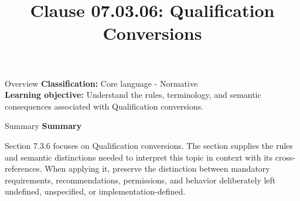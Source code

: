 \documentclass[10pt,letterpaper]{article}
\title{Clause 07.03.06: Qualification Conversions}
\author{}
\date{}
\begin{document}
\maketitle
\begin{CornellOverviewBox}{Overview}
\textbf{Classification:} Core language - Normative\\[2pt]
\textbf{Learning objective:} Understand the rules, terminology, and semantic consequences associated with Qualification conversions.
\end{CornellOverviewBox}\begin{CornellSummaryBox}{Summary}
{\sffamily\bfseries\color{Accent} Summary}\par\vspace{3pt}Section 7.3.6 focuses on Qualification conversions. The section supplies the rules and semantic distinctions needed to interpret this topic in context with its cross-references. When applying it, preserve the distinction between mandatory requirements, recommendations, permissions, and behavior deliberately left undefined, unspecified, or implementation-defined.
\end{CornellSummaryBox}
\end{document}
